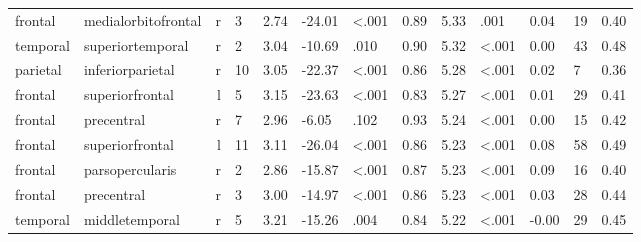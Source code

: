 \documentclass{article}
\begin{document}
\begin{longtable}{llrR{1.3cm}R{1cm}R{1.3cm}R{1cm}R{1cm}R{1.3cm}R{1cm}R{1.8cm}R{1.3cm}R{1.8cm}}
   frontal &       medialorbitofrontal &    r &         3 &                  2.74 &           -24.01 &      \textless.001 &                               0.89 &                          5.33 &                            .001 &   0.04 &     19 &      0.40 \\
  temporal &          superiortemporal &    r &         2 &                  3.04 &           -10.69 &               .010 &                               0.90 &                          5.32 &                   \textless.001 &   0.00 &     43 &      0.48 \\
  parietal &          inferiorparietal &    r &        10 &                  3.05 &           -22.37 &      \textless.001 &                               0.86 &                          5.28 &                   \textless.001 &   0.02 &      7 &      0.36 \\
   frontal &           superiorfrontal &    l &         5 &                  3.15 &           -23.63 &      \textless.001 &                               0.83 &                          5.27 &                   \textless.001 &   0.01 &     29 &      0.41 \\
   frontal &                precentral &    r &         7 &                  2.96 &            -6.05 &               .102 &                               0.93 &                          5.24 &                   \textless.001 &   0.00 &     15 &      0.42 \\
   frontal &           superiorfrontal &    l &        11 &                  3.11 &           -26.04 &      \textless.001 &                               0.86 &                          5.23 &                   \textless.001 &   0.08 &     58 &      0.49 \\
   frontal &           parsopercularis &    r &         2 &                  2.86 &           -15.87 &      \textless.001 &                               0.87 &                          5.23 &                   \textless.001 &   0.09 &     16 &      0.40 \\
   frontal &                precentral &    r &         3 &                  3.00 &           -14.97 &      \textless.001 &                               0.86 &                          5.23 &                   \textless.001 &   0.03 &     28 &      0.44 \\
  temporal &            middletemporal &    r &         5 &                  3.21 &           -15.26 &               .004 &                               0.84 &                          5.22 &                   \textless.001 &  -0.00 &     29 &      0.45 \\

\end{longtable}
\end{document}
